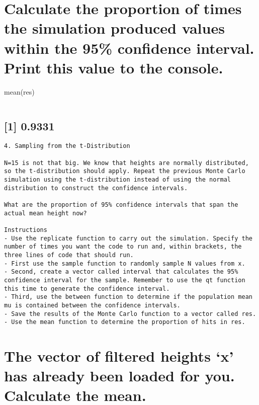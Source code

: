 \documentclass[
]{article}
\begin{document}
\hypertarget{calculate-the-proportion-of-times-the-simulation-produced-values-within-the-95-confidence-interval.-print-this-value-to-the-console.}{%
\section{Calculate the proportion of times the simulation produced
values within the 95\% confidence interval. Print this value to the
console.}\label{calculate-the-proportion-of-times-the-simulation-produced-values-within-the-95-confidence-interval.-print-this-value-to-the-console.}}

mean(res)

\begin{verbatim}
\end{verbatim}

\hypertarget{section-2}{%
\subsection{{[}1{]} 0.9331}\label{section-2}}

\begin{verbatim}
4. Sampling from the t-Distribution

N=15 is not that big. We know that heights are normally distributed, so the t-distribution should apply. Repeat the previous Monte Carlo simulation using the t-distribution instead of using the normal distribution to construct the confidence intervals.

What are the proportion of 95% confidence intervals that span the actual mean height now?

Instructions
- Use the replicate function to carry out the simulation. Specify the number of times you want the code to run and, within brackets, the three lines of code that should run.
- First use the sample function to randomly sample N values from x.
- Second, create a vector called interval that calculates the 95% confidence interval for the sample. Remember to use the qt function this time to generate the confidence interval.
- Third, use the between function to determine if the population mean mu is contained between the confidence intervals.
- Save the results of the Monte Carlo function to a vector called res.
- Use the mean function to determine the proportion of hits in res.
\end{verbatim}

\hypertarget{the-vector-of-filtered-heights-x-has-already-been-loaded-for-you.-calculate-the-mean.}{%
\section{The vector of filtered heights `x' has already been loaded for
you. Calculate the
mean.}\label{the-vector-of-filtered-heights-x-has-already-been-loaded-for-you.-calculate-the-mean.}}
\end{document}
